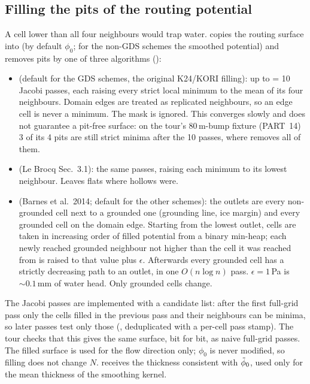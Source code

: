 \subsection{Filling the pits of the routing potential}\label{disc:filling}
A cell lower than all four neighbours would trap water.  copies the routing surface into
 (by default $\phi_0$; for the non-GDS schemes the smoothed potential) and removes pits by one of
three algorithms ():
\begin{itemize}[leftmargin=1.5em]
\item {} (default for the GDS schemes, the original K24/KORI filling): up to  = 10
  Jacobi passes, each raising every strict local minimum to the mean of its four neighbours. Domain edges are
  treated as replicated neighbours, so an edge cell is never a minimum. The mask is ignored. This converges slowly
  and does not guarantee a pit-free surface: on the tour's 80\,m-bump fixture (PART~14) 3 of its 4 pits are still strict minima
  after the 10 passes, where  removes all of them.
\item {} (Le Brocq Sec.~3.1): the same passes, raising each minimum to its lowest neighbour.
  Leaves flats where hollows were.
\item {} (Barnes et al.\ 2014; default for the other schemes): the outlets are
  every non-grounded cell next to a grounded one (grounding line, ice margin) and every grounded cell on the domain
  edge. Starting from the lowest outlet, cells are taken in increasing order of filled potential from a binary
  min-heap; each newly reached grounded neighbour not higher than the cell it was reached from is raised to that
  value plus $\epsilon$. Afterwards every grounded cell has a strictly decreasing path to an outlet, in one
  $O(n\log n)$ pass. $\epsilon = 1$\,Pa is $\sim0.1$\,mm of water head. Only grounded cells change.
\end{itemize}
The Jacobi passes are implemented with a candidate list: after the first full-grid pass only the cells filled in
the previous pass and their neighbours can be minima, so later passes test only those
(, deduplicated with a per-cell pass stamp). The tour checks that this gives the same
surface, bit for bit, as naive full-grid passes. The filled surface is used for the flow direction only; $\phi_0$ is
never modified, so filling does not change $N$.  receives the thickness consistent with ${\tilde\phi_0}$,
used only for the mean thickness of the smoothing kernel.

